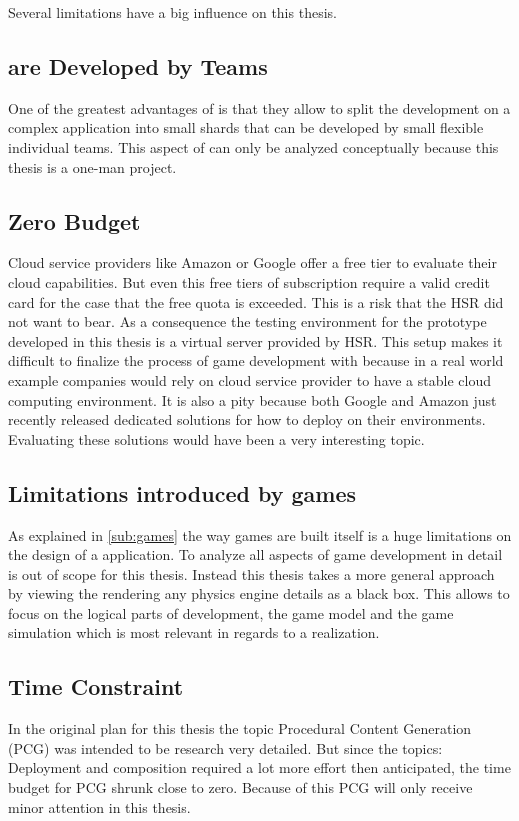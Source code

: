 Several limitations have a big influence on this thesis. 

\subsection{\ms{} are Developed by Teams}
One of the greatest advantages of \mss{} is that they allow to split the
development on a complex application into small shards that can be developed by
small flexible individual teams. This aspect of \mss{} can only be analyzed
conceptually because this thesis is a one-man project.

\subsection{Zero Budget}
Cloud service providers like Amazon or Google offer a free tier to evaluate
their cloud capabilities. But even this free tiers of subscription require a
valid credit card for the case that the free quota is exceeded. This is a risk
that the HSR did not want to bear. As a consequence the testing environment for
the prototype developed in this thesis is a virtual server provided by HSR. This
setup makes it difficult to finalize the process of game development with \mss{}
because in a real world example companies would rely on cloud service provider
to have a stable cloud computing environment. It is also a pity because both
Google and Amazon just recently released dedicated solutions for how to deploy
\ogs{} on their environments. Evaluating these solutions would have been a very
interesting topic.

\subsection{Limitations introduced by games}
As explained in \autoref{sub:games} the way games are built itself is a huge
limitations on the design of a \og{} application. To analyze all aspects of game
development in detail is out of scope for this thesis. Instead this thesis takes
a more general approach by viewing the rendering any physics engine details as a
black box. This allows to focus on the logical parts of \og{} development, the
game model and the game simulation which is most relevant in regards to a \ms{}
realization.

\subsection{Time Constraint}
In the original plan for this thesis the topic Procedural Content Generation
(PCG) was intended to be research very detailed. But since the topics:
Deployment and composition required a lot more effort then anticipated, the time
budget for PCG shrunk close to zero. Because of this PCG will only receive minor
attention in this thesis. 

